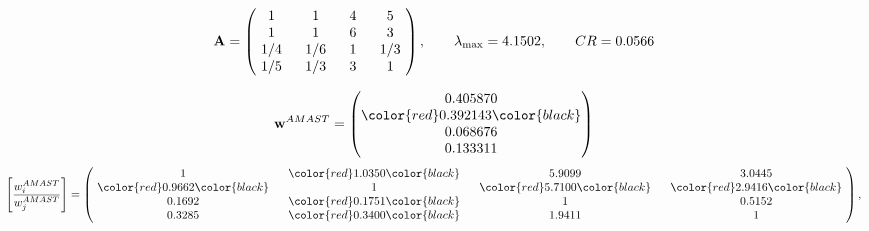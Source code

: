 \begin{example}
\begin{equation*}
\mathbf{A} =
\begin{pmatrix}
$\,\,$ 1 $\,\,$ & $\,\,$1$\,\,$ & $\,\,$4$\,\,$ & $\,\,$5 $\,\,$ \\
$\,\,$ 1 $\,\,$ & $\,\,$ 1 $\,\,$ & $\,\,$6$\,\,$ & $\,\,$3 $\,\,$ \\
$\,\,$ 1/4$\,\,$ & $\,\,$ 1/6$\,\,$ & $\,\,$ 1 $\,\,$ & $\,\,$ 1/3 $\,\,$ \\
$\,\,$ 1/5$\,\,$ & $\,\,$ 1/3$\,\,$ & $\,\,$3$\,\,$ & $\,\,$ 1  $\,\,$ \\
\end{pmatrix},
\qquad
\lambda_{\max} =
4.1502,
\qquad
CR = 0.0566
\end{equation*}

\begin{equation*}
\mathbf{w}^{AMAST} =
\begin{pmatrix}
0.405870\\
\color{red} 0.392143\color{black} \\
0.068676\\
0.133311
\end{pmatrix}\end{equation*}
\begin{equation*}
\left[ \frac{{w}^{AMAST}_i}{{w}^{AMAST}_j} \right] =
\begin{pmatrix}
$\,\,$ 1 $\,\,$ & $\,\,$\color{red} 1.0350\color{black} $\,\,$ & $\,\,$5.9099$\,\,$ & $\,\,$3.0445$\,\,$ \\
$\,\,$\color{red} 0.9662\color{black} $\,\,$ & $\,\,$ 1 $\,\,$ & $\,\,$\color{red} 5.7100\color{black} $\,\,$ & $\,\,$\color{red} 2.9416\color{black}   $\,\,$ \\
$\,\,$0.1692$\,\,$ & $\,\,$\color{red} 0.1751\color{black} $\,\,$ & $\,\,$ 1 $\,\,$ & $\,\,$0.5152 $\,\,$ \\
$\,\,$0.3285$\,\,$ & $\,\,$\color{red} 0.3400\color{black} $\,\,$ & $\,\,$1.9411$\,\,$ & $\,\,$ 1  $\,\,$ \\
\end{pmatrix},
\end{equation*}


\end{example}
